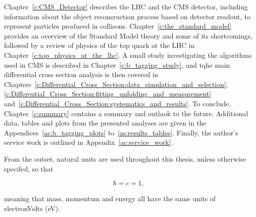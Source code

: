 Chapter~\ref{c:CMS_Detector} describes the LHC and the CMS detector, including information about the object
reconsruction process based on detector readout, to represent particles produced in collisons.
Chapter~\ref{c:the_standard_model} provides an overview of the Standard Model theory and some of its
shortcomings, followed by a review of physics of the top quark at the LHC in
Chapter~\ref{c:top_physics_at_the_lhc}. A small study investigating the \btagging algorithms used in CMS is
described in Chapter~\ref{c:b_tagging_study}, and tqhe main \ttbar differential cross section analysis is then
covered in
Chapters~\ref{c:Differential_Cross_Section:data_simulation_and_selection},\ref{c:Differential_Cross_Section:fitting_unfolding_and_measurement}
and~\ref{c:Differential_Cross_Section:systematics_and_results}. To conclude, Chapter~\ref{c:summary} contains
a summary and outlook to the future. Additional data, tables and plots from the presented analyses are given
in the Appendices~\ref{ac:b_tagging_plots} to~\ref{as:results_tables}. Finally, the author's service work is
outlined in Appendix~\ref{ac:service_work}.

From the outset, natural units are used throughout this thesis, unless otherwise specifed, so that

\begin{equation}
\hbar = c = 1,
\end{equation}

meaning that mass, momentum and energy all have the same units of electronVolts (eV).